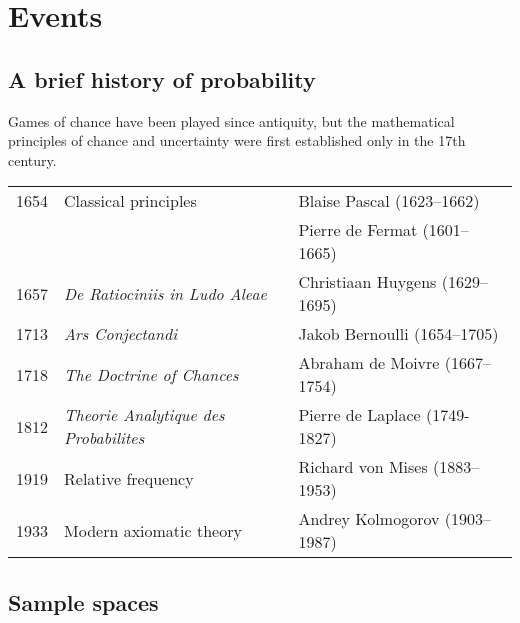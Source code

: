 \chapter{Events}\label{chap:events}

\section{A brief history of probability}
Games of chance have been played since antiquity, but the mathematical principles of chance and uncertainty were first established only in the 17th century.

\begin{center}
\begin{tabular}{lll}
1654		& Classical principles 	& Blaise Pascal (1623--1662) \\
    		&						& Pierre de Fermat (1601--1665)  \\
1657		& \textit{De Ratiociniis in Ludo Aleae} & Christiaan Huygens (1629--1695) \\
1713		& \textit{Ars Conjectandi} & Jakob Bernoulli (1654--1705) \\ 
1718		& \textit{The Doctrine of Chances} & Abraham de Moivre (1667--1754) \\
1812		& \textit{Theorie Analytique des Probabilites} & Pierre de Laplace (1749-1827) \\
1919		& Relative frequency & Richard von Mises (1883--1953) \\
1933		& Modern axiomatic theory & Andrey Kolmogorov (1903--1987)\\
\end{tabular}
\end{center}

\section{Sample spaces}

